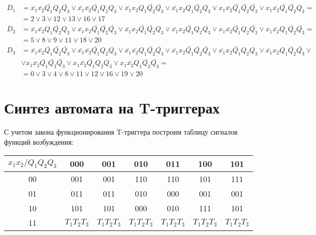 \documentclass[listings]{labreport}
\begin{document}
\begin{align*}
D_1 & = \bar{x_1}\bar{x_2}\bar{Q_1}Q_2\bar{Q_3} \lor \bar{x_1}\bar{x_2}\bar{Q_1}Q_2Q_3 \lor \bar{x_1}x_2Q_1\bar{Q_2}\bar{Q_3} \lor \bar{x_1}x_2Q_1\bar{Q_2}Q_3 \lor x_1\bar{x_2}\bar{Q_1}\bar{Q_2}\bar{Q_3} \lor x_1\bar{x_2}\bar{Q_1}\bar{Q_2}Q_3 = \\ & = 2 \lor 3 \lor 12 \lor 13 \lor 16 \lor 17 \\
D_2 & = \bar{x_1}\bar{x_2}Q_1\bar{Q_2}Q_3 \lor \bar{x_1}x_2\bar{Q_1}\bar{Q_2}\bar{Q_3} \lor \bar{x_1}x_2\bar{Q_1}\bar{Q_2}Q_3 \lor \bar{x_1}x_2\bar{Q_1}Q_2Q_3 \lor x_1\bar{x_2}\bar{Q_1}Q_2\bar{Q_3} \lor x_1\bar{x_2}Q_1\bar{Q_2}\bar{Q_3}       = \\ & = 5 \lor 8 \lor 9 \lor 11 \lor 18 \lor 20 \\
D_3 & = \bar{x_1}\bar{x_2}\bar{Q_1}\bar{Q_2}\bar{Q_3} \lor \bar{x_1}\bar{x_2}\bar{Q_1}Q_2Q_3 \lor \bar{x_1}\bar{x_2}Q_1\bar{Q_2}\bar{Q_3} \lor \bar{x_1}x_2\bar{Q_1}\bar{Q_2}\bar{Q_3} \lor \bar{x_1}x_2\bar{Q_1}Q_2Q_3 \lor \bar{x_1}x_2Q_1\bar{Q_2}\bar{Q_3} \lor \\ & \lor x_1\bar{x_2}\bar{Q_1}\bar{Q_2}\bar{Q_3} \lor x_1\bar{x_2}\bar{Q_1}Q_2Q_3 \lor x_1\bar{x_2}Q_1\bar{Q_2}\bar{Q_3} = \\ & = 0 \lor 3 \lor 4 \lor 8 \lor 11 \lor 12 \lor 16 \lor 19 \lor 20
\end{align*}

\section*{Синтез автомата на T-триггерах}

С учетом закона функционирования T-триггера построим таблицу
сигналов функций возбуждения:

\begin{tabular}{|*{7}{c|}}
\hline
$x_1x_2/Q_1Q_2Q_3$ & 000 & 001 & 010 & 011 & 100 & 101\\\hline
00 & 001 & 001 & 110 & 110 & 101 & 111\\\hline
01 & 011 & 011 & 010 & 000 & 001 & 001\\\hline
10 & 101 & 101 & 000 & 010 & 111 & 101\\\hline
11 & $T_1T_2T_3$ & $T_1T_2T_3$ & $T_1T_2T_3$ & $T_1T_2T_3$ & $T_1T_2T_3$ & $T_1T_2T_3$\\\hline
\end{tabular}
\end{document}
